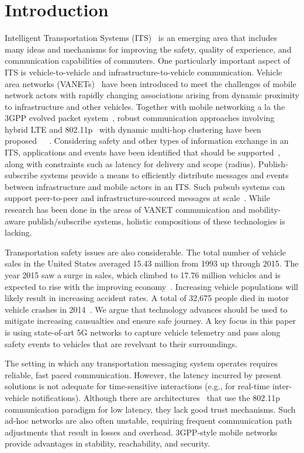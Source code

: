 \section{Introduction}

Intelligent Transportation Systems (ITS)~\cite{zhang2011data} is an emerging
area that includes many ideas and mechanisms for improving the safety,
quality of experience, and communication capabilities of
commuters. One particularly important aspect of ITS is
vehicle-to-vehicle and infrastructure-to-vehicle
communication. Vehicle area networks (VANETs)~\cite{VANET} have been
introduced to meet the challenges of mobile network actors with
rapidly changing associations arising from dynamic proximity to
infrastructure and other vehicles. Together with mobile networking a
la the 3GPP evolved packet system~\cite{3GPP}, robust communication
approaches involving hybrid LTE and 802.11p~\cite{802.11p} with
dynamic multi-hop clustering have been
proposed~\cite{ucar2016multihop}~\cite{wolny2008modified}~\cite{zhang2011novel}.
Considering safety and
other types of information exchange in an ITS, applications and events
have been identified that should be supported~\cite{vanet-apps}, along
with constraints such as latency for delivery and scope
(radius). Publish-subscribe systems provide a means to efficiently
distribute messages and events between infrastructure and mobile
actors in an ITS. Such pubsub systems can support peer-to-peer and
infrastructure-sourced messages at scale~\cite{nasim2014mobile}.  While
research has been done in the areas of VANET communication and
mobility-aware publish/subscribe systems, holistic compositions of
these technologies is lacking.

Transportation safety issues are also considerable.  The total number
of vehicle sales in the United States averaged 15.43 million from 1993
up through 2015. The year 2015 saw a surge in sales, which climbed to
17.76 million vehicles and is expected to rise with the improving
economy~\cite{te}. Increasing vehicle populations will likely result
in increasing accident rates. A total of 32,675 people died in motor
vehicle crashes in 2014~\cite{iihs}. We argue that technology advances
should be used to mitigate increasing causualties and ensure safe
journey. A key focus in this paper is using state-of-art 5G networks
to capture vehicle telemetry and pass along safety events to vehicles
that are revelvant to their surroundings.

The setting in which any transportation messaging system operates
requires reliable, fast paced communication. However, the latency
incurred by present solutions is not adequate for time-sensitive
interactions (e.g., for real-time inter-vehicle
notifications). Although there are architectures~\cite{mh} that use
the 802.11p communication paradigm for low latency, they lack good
trust mechanisms. Such ad-hoc networks are also often unstable,
requiring frequent communication path adjustments that result in
losses and overhead. 3GPP-style mobile networks provide advantages in
stability, reachability, and security.

